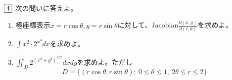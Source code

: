 \begin{tcolorbox} %
	$\fbox{4}$ 次の問いに答えよ。
\begin{enumerate}
	\item 極座標表示$x= r\cos{\theta}, y= r\sin{\theta}$に対して、Jacobian$\frac{\partial(x, y)}{\partial(r, \theta)}$を求めよ。
	\item $\int x^2\cdot 2^{x^3} dx$を求めよ。
	\item $\iint_{D} 2^{(x^2+ y^2)^{3/2}} dxdy$を求めよ。ただし
\begin{equation*}
	D= \{(r\cos{\theta}, r\sin{\theta});\ 0\le \theta\le 1,\ 2\theta\le r\le 2\}
\end{equation*}
\end{enumerate}
\end{tcolorbox}


